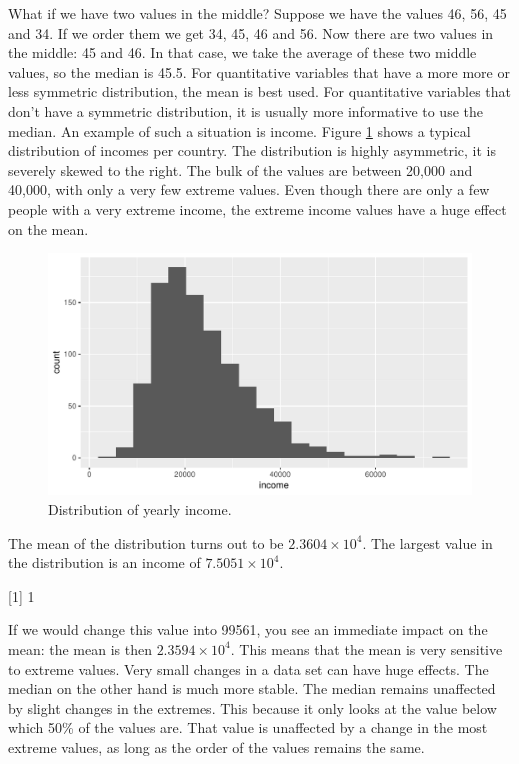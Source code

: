 \documentclass[]{report}\usepackage[]{graphicx}\usepackage[]{color}
\makeatletter
\def\maxwidth{ %
  \ifdim\Gin@nat@width>\linewidth
    \linewidth
  \else
    \Gin@nat@width
  \fi
}
\makeatother
\begin{document}
What if we have two values in the middle? Suppose we have the values 46, 56, 45 and 34. If we order them we get 34, 45, 46 and 56. Now there are two values in the middle: 45 and 46. In that case, we take the average of these two middle values, so the median is 45.5. For quantitative variables that have a more more or less symmetric distribution, the mean is best used. For quantitative variables that don't have a symmetric distribution, it is usually more informative to use the median. An example of such a situation is income. Figure \ref{fig:median} shows a typical distribution of incomes per country. The distribution is highly asymmetric, it is severely skewed to the right. The bulk of the values are between 20,000 and 40,000, with only a very few extreme values. Even though there are only a few people with a very extreme income, the extreme income values have a huge effect on the mean.

\begin{figure}

{\centering \includegraphics[width=\maxwidth]{figure/median-1} 

}

\caption[Distribution of yearly income]{Distribution of yearly income.}\label{fig:median}
\end{figure}



The mean of the distribution turns out to be \ensuremath{2.3604\times 10^{4}}. The largest value in the distribution is an income of \ensuremath{7.5051\times 10^{4}}.

[1] 1


If we would change this value into 99561, you see an immediate impact on the mean: the mean is then \ensuremath{2.3594\times 10^{4}}. This means that the mean is very sensitive to extreme values. Very small changes in a data set can have huge effects. The median on the other hand is much more stable. The median remains unaffected by slight changes in the extremes. This because it only looks at the value below which 50\% of the values are. That value is unaffected by a change in the most extreme values, as long as the order of the values remains the same.
\end{document}
